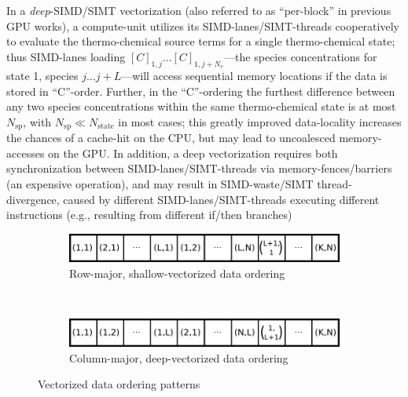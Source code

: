 \documentclass[12pt,number,sort&compress,preprint]{elsarticle}
\begin{document}
In a \textit{deep}-SIMD\slash SIMT vectorization (also referred to as ``per-block'' in previous GPU works), a compute-unit utilizes its SIMD-lanes\slash SIMT-threads cooperatively to evaluate the thermo-chemical source terms for a single thermo-chemical state; thus SIMD-lanes loading $[C]_{1, j} \ldots [C]_{1, j + N_v}$---the species concentrations for state 1, species $j \ldots j + L$---will access sequential memory locations if the data is stored in ``C''-order.
Further, in the ``C''-ordering the furthest difference between any two species concentrations within the same thermo-chemical state is at most $N_{\text{sp}}$, with $N_{\text{sp}} \ll N_{\text{state}}$ in most cases; this greatly improved data-locality increases the chances of a cache-hit on the CPU, but may lead to uncoalesced memory-accesses on the GPU.
In addition, a deep vectorization requires both synchronization between SIMD-lanes\slash SIMT-threads via memory-fences\slash barriers (an expensive operation), and may result in SIMD-waste\slash SIMT thread-divergence, caused by different SIMD-lanes\slash SIMT-threads executing different instructions (e.g., resulting from different if\slash then branches)

\begin{figure}[htb]
  \centering
  \begin{minipage}{0.6\linewidth}
    \begin{subfigure}[t]{\textwidth}
	\includegraphics[width=\textwidth]{row_major_split.pdf}
	\caption{Row-major, shallow-vectorized data ordering}
	\label{F:row_major_split}
    \end{subfigure}
    \\
    \begin{subfigure}[t]{\textwidth}
	\includegraphics[width=\textwidth]{column_major_split.pdf}
	\caption{Column-major, deep-vectorized data ordering}
	\label{F:column_major_split}
    \end{subfigure}
  \end{minipage}
  \caption{Vectorized data ordering patterns}
  \label{F:vector_data}
\end{figure}
\end{document}
